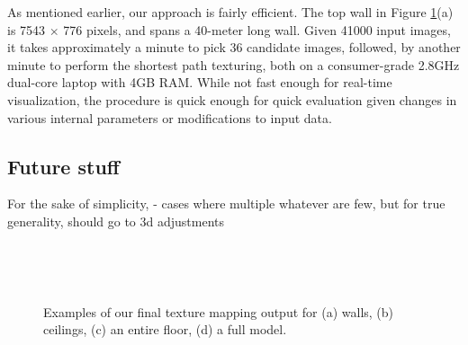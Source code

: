 \documentclass[]{spie}  %
\begin{document}
As mentioned earlier, our approach is fairly efficient. The top wall
in Figure \ref{fig:results}(a) is 7543 $\times$ 776 pixels, and spans a
40-meter long wall. Given 41000 input images, it takes approximately a
minute to pick 36 candidate images, followed, by another minute to
perform the shortest path texturing, both on a consumer-grade 2.8GHz
dual-core laptop with 4GB RAM. While not fast enough for real-time
visualization, the procedure is quick enough for quick evaluation
given changes in various internal parameters or modifications to input
data.

\subsection{Future stuff}
For the sake of simplicity, - cases where multiple whatever are few,
but for true generality, should go to 3d adjustments


\begin{figure}
  \centering
   ~~~~~~~~
  \centering

  \centering {} ~~~~~~~~ \centering
  \caption{Examples of our final texture mapping output for (a) walls,
    (b) ceilings, (c) an entire floor, (d) a full model.}
  \label{fig:results}
\end{figure}
\end{document}
